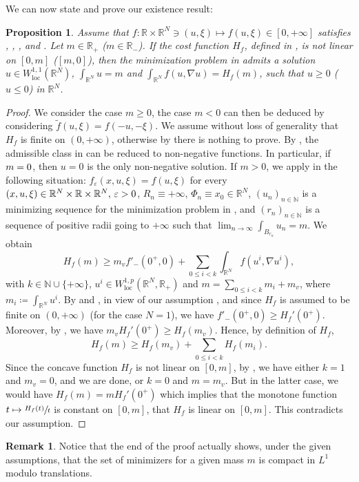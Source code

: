 \documentclass[JEP,XML,SOM,Unicode,published]{cedram}
\theoremstyle{plain}
\newtheorem{proposition}[theorem]{Proposition}
\theoremstyle{definition}
\newtheorem{remark}[theorem]{Remark}
\newcommand{\N}{\mathbb{N}}
\newcommand{\R}{\mathbb{R}}
\newcommand{\loc}{\mathrm{loc}}
\newcommand{\eps}{\varepsilon}
\begin{document}
We can now state and prove our existence result:
\begin{proposition}\label{existenceProfile}
Assume that $f:\R \times \R^N \ni (u,\xi) \mapsto f(u,\xi)\in [0,+\infty]$ satisfies , , ,  and . Let \(m\in \R_+\) (\resp \(m\in \R_-\)). If the cost function $H_f$, defined in , is not linear on \([0,m]\) (\resp $[m,0]$), then the minimization problem in  admits a solution \(u\in W^{1,1}_\loc(\R^N)\), \ie \(\int_{\R^N} u = m\) and \(\int_{\R^N}f(u,\nabla u)=H_f(m)\), such that $u\geq 0$ (\resp $u\leq 0$) in $\R^N$.
\end{proposition}
\begin{proof}
We consider the case $m\geq 0$, the case $m<0$ can then be deduced by considering $\tilde{f}(u,\xi)=f(-u,-\xi)$. We assume without loss of generality that $H_f$ is finite on $(0,+\infty)$, otherwise by  there is nothing to prove. By , the admissible class in  can be reduced to non-negative functions. In particular, if~\(m=\nobreak0\), then \(u=0\) is the only non-negative solution. If \(m>0\), we apply  in the following situation: \(f_\eps(x,u,\xi)=f(u,\xi)\) for every \((x,u,\xi)\in\R^N\times\R\times\R^N$, $\varepsilon>0\), \(R_n\equiv +\infty\), \(\Phi_n\equiv x_0\in\R^N\), \((u_n)_{n\in\N}\) is a minimizing sequence for the minimization problem in , and \((r_n)_{n\in\N}\) is a sequence of positive radii going to \(+\infty\) such that \(\lim_{n\to\infty}\int_{B_{r_n}}u_n=m\). We obtain
\[
H_f(m)\geq m_v f'_-(0^+,0)+\sum_{0\leq i<k}\int_{\R^N}f(u^i,\nabla u^i),
\]
with \(k\in\N\cup\{+\infty\}\), \(u^i\in W^{1,p}_\loc(\R^N,\R_+)\) and \(m=\sum_{0\leq i<k}m_i+m_v\), where \(m_i\coloneqq\int_{\R^N}u^i\). By  and , in view of our assumption , and since $H_f$ is assumed to be finite on $(0,+\infty)$ (for the case $N=1$), we have \(f'_-(0^+,0)\geq H_f'(0^+)\). Moreover, by , we have \(m_v H_f'(0^+)\geq H_f(m_v)\). Hence, by definition of \(H_f\),
\[
H_f(m)\geq H_f(m_v)+\sum_{0\leq i<k}H_f(m_i).
\]
Since the concave function \(H_f\) is not linear on \([0,m]\), by , we have either \(k=1\) and \(m_v=0\), and we are done, or \(k=0\) and \(m=m_v\). But in the latter case, we would have \(H_f(m)=mH_f'(0^+)\) which implies that the monotone function \(t\mapsto \sfrac{H_f(t)}{t}\) is constant on \([0,m]\), \ie that \(H_f\) is linear on \([0,m]\). This contradicts our assumption.
\end{proof}
\begin{remark}\label{compact_modulo}
Notice that the end of the proof actually shows, under the given assumptions, that the set of minimizers for a given mass $m$ is compact in $L^1$ modulo translations.
\end{remark}
\end{document}
